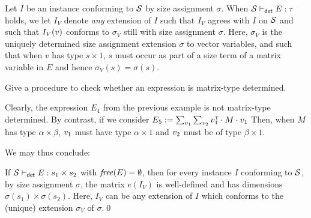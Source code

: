 Let $I$ be an instance conforming to $\mathcal{S}$
by size assignment $\sigma$. When  $\mathcal{S}\vdash_{\textsf{det}}E:\tau$ holds, we let
$I_V$ denote \textit{any} extension of $I$ such that $I_V$ agrees with $I$ on $\mathcal{S}$ and such that
$I_V(v)$ conforms to $\sigma_V$ still with size assignment $\sigma$. Here, $\sigma_V$ is the uniquely
determined size assignment extension $\sigma$ to vector variables, and such that when $v$ has type
$s\times 1$, $s$ must occur as part of a size term of a matrix variable in $E$ and hence $\sigma_V(s)=\sigma(s)$.

\begin{todo}
Give a procedure to check whether an expression is matrix-type determined.
\end{todo}
%



\begin{example}
Clearly, the expression $E_4$ from the previous example is not matrix-type determined. By contrast, if we consider
$E_5:=\sum_{v_1}\sum_{v_2} v_1^{\textsc{t}}\cdot M\cdot v_1$
Then, when $M$ has type $\alpha\times \beta$, $v_1$ must have type $\alpha\times 1$ and
$v_2$ must be of type $\beta\times 1$.
\end{example}




We may thus conclude:
\begin{proposition}
If $\mathcal{S} \vdash_{\mathsf{det}} E : s_1 \times s_2$ with $\operatorname{\mathit{free}}(E)=\emptyset$, then for every instance $I$
conforming to $\mathcal{S}$, by size assignment $\sigma$, the
matrix $e(I_V)$ is well-defined and has dimensions
$\sigma(s_1) \times \sigma(s_2)$. Here, $I_V$ can be any extension of $I$ which conforms to the (unique) extension $\sigma_V$ of $\sigma$.\qed
\end{proposition}

